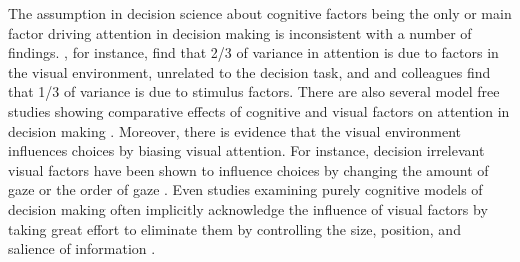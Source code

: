 \documentclass[english,natbib,man,floatsintext]{apa6}
\begin{document}

The assumption in decision science about cognitive factors being the only or main factor driving attention in decision making is inconsistent with a number of findings. \cite{vanderlans2008}, for instance, find that 2/3 of variance in attention is due to factors in the visual environment, unrelated to the decision task, and \cite{towal2013a} and colleagues find that 1/3 of variance is due to stimulus factors. There are also several model free studies showing comparative effects of cognitive and visual factors on attention in decision making \citep{gidloef2017a, orquin2015a, orquin2019a}. Moreover, there is evidence that the visual environment influences choices by biasing visual attention. For instance, decision irrelevant visual factors have been shown to influence choices by changing the amount of gaze \citep{peschel2019,chandon2009a} or the order of gaze \citep{reeck2017a}. Even studies examining purely cognitive models of decision making often implicitly acknowledge the influence of visual factors by taking great effort to eliminate them by controlling the size, position, and salience of information \citep{brandstatter2014, gloeckner2011a, perkovic2018}.
\end{document}

